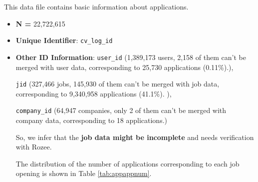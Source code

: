 \documentclass[12pt]{article}
\begin{document}
This data file contains basic information about applications.


\begin{itemize}
    \item \textbf{N = }22,722,615
    \item \textbf{Unique Identifier}: \texttt{cv\_log\_id}
    \item \textbf{Other ID Information}: \texttt{user\_id} (1,389,173 users, 2,158 of them can't be merged with user data, corresponding to 25,730 applications (0.11\%).), 
    
    \texttt{jid} (327,466 jobs, 145,930 of them can't be merged with job data, corresponding to 9,340,958 applications (41.1\%). ), 
    
    \texttt{company\_id} (64,947 companies, only 2 of them can't be merged with company data, corresponding to 18 applications.)

So, we infer that the \textbf{job data might be incomplete} and needs verification with Rozee.
    
    The distribution of the number of applications corresponding to each job opening is shown in Table \ref{tab:appappnum}.
    
    \end{itemize}

\end{document}
